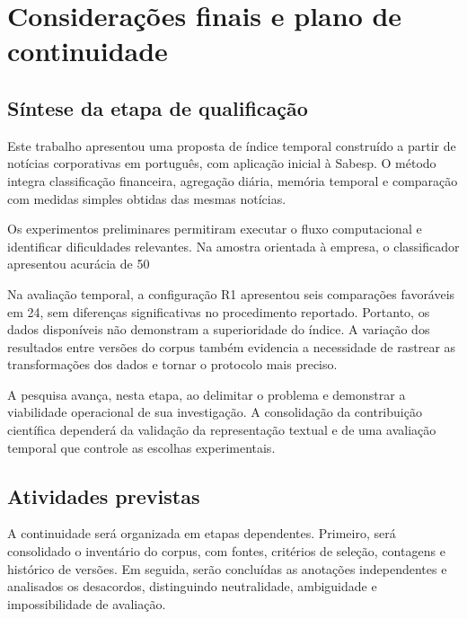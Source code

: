 \chapter{Considerações finais e plano de continuidade}
\label{cap:consideracoes}

\section{Síntese da etapa de qualificação}

Este trabalho apresentou uma proposta de índice temporal construído a partir de notícias corporativas em português, com aplicação inicial à Sabesp. O método integra classificação financeira, agregação diária, memória temporal e comparação com medidas simples obtidas das mesmas notícias.

Os experimentos preliminares permitiram executar o fluxo computacional e identificar dificuldades relevantes. Na amostra orientada à empresa, o classificador apresentou acurácia de 50%

Na avaliação temporal, a configuração R1 apresentou seis comparações favoráveis em 24, sem diferenças significativas no procedimento reportado. Portanto, os dados disponíveis não demonstram a superioridade do índice. A variação dos resultados entre versões do corpus também evidencia a necessidade de rastrear as transformações dos dados e tornar o protocolo mais preciso.

A pesquisa avança, nesta etapa, ao delimitar o problema e demonstrar a viabilidade operacional de sua investigação. A consolidação da contribuição científica dependerá da validação da representação textual e de uma avaliação temporal que controle as escolhas experimentais.

\section{Atividades previstas}

A continuidade será organizada em etapas dependentes. Primeiro, será consolidado o inventário do corpus, com fontes, critérios de seleção, contagens e histórico de versões. Em seguida, serão concluídas as anotações independentes e analisados os desacordos, distinguindo neutralidade, ambiguidade e impossibilidade de avaliação.

